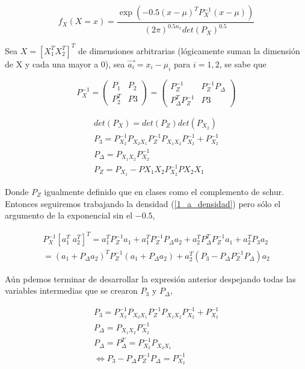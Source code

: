 		\begin{equation}
			f_X(X=x)=\frac{ \exp(-0.5(x-\mu)^TP_X^{-1}(x-\mu)) }{ (2\pi)^{0.5n_x} det(P_X)^{0.5} } 
			\label{1_a_densidad}
		\end{equation}

		Sea $X = [X_1^T X_2^T]^T$ de dimensiones arbitrarias (lógicamente suman la dimensión de X y cada una mayor a 0), sea $\vec{a_i} = x_i - \mu_i$ para $i=1,2$, se sabe que  

		\begin{equation}
			P_X^{-1} = 
			 \begin{pmatrix}
			  P_1 & P_2 \\
			  P_2^T & P3 
			 \end{pmatrix}
			 =
			 \begin{pmatrix}
			  P_Z^{-1} & P_Z^{-1}P_{\Delta} \\
			  P_{\Delta}^TP_Z^{-1}  & P3 
			 \end{pmatrix}
		\end{equation}

		\begin{eqnarray}
			det(P_X) = det(P_Z)det(P_{X_2})\\
			P_3 = P_{X_2}^{-1} P_{X_2X_1}P_Z^{-1}P_{X_1X_2}P_{X_2}^{-1} + P_{X_2}^{-1} \\
			P_\Delta = P_{X_1X_2} P_{X_2}^{-1}\\
			P_Z = P_{X_1} - P{X_1 X_2}P_{X_2}^{-1}P{X_2 X_1}
		\end{eqnarray}

		Donde $P_Z$ igualmente definido que en clases como el complemento de schur. Entonces seguiremos trabajando la densidad (\ref{1_a_densidad}) pero sólo el argumento de la exponencial sin el $-0.5$,

		\begin{eqnarray}
			[a_1^T \; a_2^T]P_X^{-1}[a_1^T \; a_2^T]^T =a_1^T P_Z^{-1} a_1 + a_1^T P_Z^{-1} P_{\Delta} a_2 + a_2^T P_{\Delta}^T P_Z^{-1} a_1 + a_2^T P_3 a_2  \\
			= (a_1 + P_{\Delta} a_2)^T P_Z^{-1} (a_1 + P_{\Delta} a_2) + a_2^T( P_3 - P_{\Delta} P_Z^{-1} P_{\Delta}) a_2
			\label{1_a_casiherramienta}
		\end{eqnarray}

		Aún pdemos terminar de desarrollar la expresión anterior despejando todas las variables intermedias que se crearon $P_3$ y $P_\Delta$, 

		\begin{eqnarray}
			P_3 = P_{X_2}^{-1} P_{X_2X_1}P_Z^{-1}P_{X_1X_2}P_{X_2}^{-1} + P_{X_2}^{-1} \\
			P_\Delta = P_{X_1X_2} P_{X_2}^{-1}  \\
			P_\Delta=P_\Delta^T = P_{X_2}^{-1} P_{X_2X_1}\\
			\iff P_3 - P_{\Delta} P_Z^{-1} P_{\Delta} = P_{X_2}^{-1}
		\end{eqnarray}

